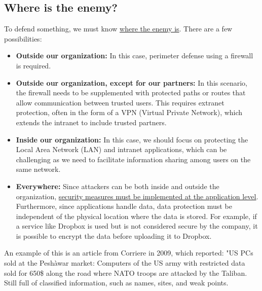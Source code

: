 \subsection{Where is the enemy?}
To defend something, we must know \ul{where the enemy is}. There are a few possibilities:

\begin{itemize}
  \item \textbf{Outside our organization:} In this case, perimeter defense using a firewall is required.
  \item \textbf{Outside our organization, except for our partners:} In this scenario, the firewall needs to be supplemented with protected paths or routes that allow communication between trusted users. This requires extranet protection, often in the form of a VPN (Virtual Private Network), which extends the intranet to include trusted partners.
  \item \textbf{Inside our organization:} In this case, we should focus on protecting the Local Area Network (LAN) and intranet applications, which can be challenging as we need to facilitate information sharing among users on the same network.
  \item \textbf{Everywhere:} Since attackers can be both inside and outside the organization, \ul{security measures must be implemented at the application level}. Furthermore, since applications handle data, data protection must be independent of the physical location where the data is stored. For example, if a service like Dropbox is used but is not considered secure by the company, it is possible to encrypt the data before uploading it to Dropbox.
\end{itemize}


An example of this is an article from Corriere in 2009, which reported: "US PCs sold at the Peshàwar market: Computers
of the US army with restricted data sold for 650\$ along the road where NATO troops are attacked by the
Taliban. Still full of classified information, such as names, sites, and weak points.




